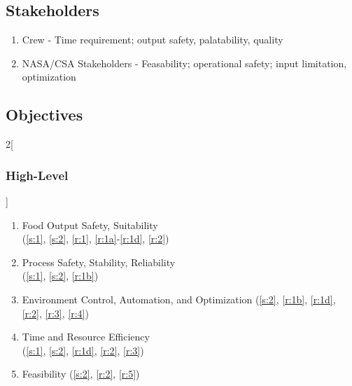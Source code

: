 \documentclass{../tex/report}
\begin{document}
\clearpage
\subsection{Stakeholders}
\label{sec:stakeholders}

\begin{enumerate}[label=S\arabic*., ref=S\arabic*]
    \item \label{s:1} Crew - Time requirement; output safety, palatability, quality
    \item \label{s:2} NASA/CSA Stakeholders - Feasability; operational safety; input limitation, optimization
\end{enumerate}

\subsection{Objectives}
\label{sec:objectives}

\begin{multicols}{2}[\subsubsection{High-Level}\label{sec:hlos}]
    \begin{enumerate}[label=HL\arabic*., ref=HL\arabic*]
        \item \label{hl:output} Food Output Safety, Suitability                         \\      (\ref{s:1}, \ref{s:2}, \ref{r:1}, \ref{r:1a}-\ref{r:1d}, \ref{r:2})
        \item \label{hl:process} Process Safety, Stability, Reliability                 \\      (\ref{s:1}, \ref{s:2}, \ref{r:1b}) \\
        \item \label{hl:environment} Environment Control, Automation, and Optimization  \hfill  (\ref{s:2}, \ref{r:1b}, \ref{r:1d}, \ref{r:2}, \ref{r:3}, \ref{r:4})
        \item \label{hl:efficiency} Time and Resource Efficiency                        \\      (\ref{s:1}, \ref{s:2}, \ref{r:1d}, \ref{r:2}, \ref{r:3})
        \item \label{hl:feasibility} Feasibility                                        \hfill  (\ref{s:2}, \ref{r:2}, \ref{r:5})
    \end{enumerate}
\end{multicols}
\end{document}
